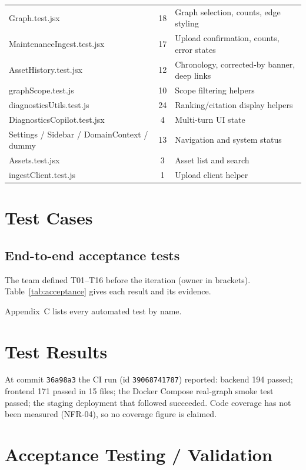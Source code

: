 \begin{table}[H]
\begin{tabularx}{\textwidth}{@{}>{\ttfamily\raggedright\arraybackslash}p{} c L@{}}
Graph.test.jsx & 18 & Graph selection, counts, edge styling \\
MaintenanceIngest.test.jsx & 17 & Upload confirmation, counts, error states \\
AssetHistory.test.jsx & 12 & Chronology, corrected-by banner, deep links \\
graphScope.test.js & 10 & Scope filtering helpers \\
diagnosticsUtils.test.js & 24 & Ranking/citation display helpers \\
DiagnosticsCopilot.test.jsx & 4 & Multi-turn UI state \\
Settings / Sidebar / DomainContext / dummy & 13 & Navigation and system status \\
Assets.test.jsx & 3 & Asset list and search \\
ingestClient.test.js & 1 & Upload client helper \\
\bottomrule
\end{tabularx}
\end{table}

\section{Test Cases}

\subsection{End-to-end acceptance tests}

The team defined T01--T16 before the iteration (owner in brackets). Table~\ref{tab:acceptance} gives each result and its evidence.



Appendix~C lists every automated test by name.

\section{Test Results}

At commit \texttt{36a98a3} the CI run (id \texttt{39068741787}) reported: backend 194 passed; frontend 171 passed in 15 files; the Docker Compose real-graph smoke test passed; the staging deployment that followed succeeded. Code coverage has not been measured (NFR-04), so no coverage figure is claimed.

\section{Acceptance Testing / Validation}

